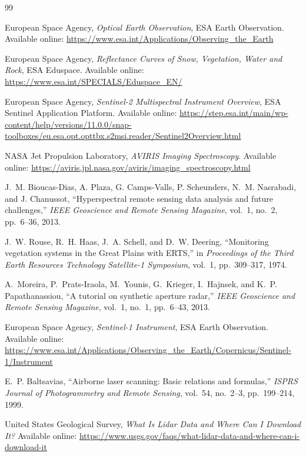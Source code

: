 \documentclass[11pt,a4paper]{article}
\begin{document}
\begin{thebibliography}{99}

European Space Agency,
\textit{Optical Earth Observation},
ESA Earth Observation.
Available online:
\url{https://www.esa.int/Applications/Observing_the_Earth}

European Space Agency,
\textit{Reflectance Curves of Snow, Vegetation, Water and Rock},
ESA Eduspace.
Available online:
\url{https://www.esa.int/SPECIALS/Eduspace_EN/}

European Space Agency,
\textit{Sentinel-2 Multispectral Instrument Overview},
ESA Sentinel Application Platform.
Available online:
\url{https://step.esa.int/main/wp-content/help/versions/11.0.0/snap-toolboxes/eu.esa.opt.opttbx.s2msi.reader/Sentinel2Overview.html}

NASA Jet Propulsion Laboratory,
\textit{AVIRIS Imaging Spectroscopy}.
Available online:
\url{https://aviris.jpl.nasa.gov/aviris/imaging_spectroscopy.html}

J.~M. Bioucas-Dias, A. Plaza, G. Camps-Valls, P. Scheunders,
N.~M. Nasrabadi, and J. Chanussot,
``Hyperspectral remote sensing data analysis and future challenges,''
\textit{IEEE Geoscience and Remote Sensing Magazine},
vol.~1, no.~2, pp.~6--36, 2013.

J.~W. Rouse, R.~H. Haas, J.~A. Schell, and D.~W. Deering,
``Monitoring vegetation systems in the Great Plains with ERTS,''
in \textit{Proceedings of the Third Earth Resources Technology
Satellite-1 Symposium},
vol.~1, pp.~309--317, 1974.

A.~Moreira, P.~Prats-Iraola, M.~Younis, G.~Krieger, I.~Hajnsek,
and K.~P. Papathanassiou,
``A tutorial on synthetic aperture radar,''
\textit{IEEE Geoscience and Remote Sensing Magazine},
vol.~1, no.~1, pp.~6--43, 2013.

European Space Agency,
\textit{Sentinel-1 Instrument},
ESA Earth Observation.
Available online:
\url{https://www.esa.int/Applications/Observing_the_Earth/Copernicus/Sentinel-1/Instrument}

E.~P. Baltsavias,
``Airborne laser scanning: Basic relations and formulas,''
\textit{ISPRS Journal of Photogrammetry and Remote Sensing},
vol.~54, no.~2--3, pp.~199--214, 1999.

United States Geological Survey,
\textit{What Is Lidar Data and Where Can I Download It?}
Available online:
\url{https://www.usgs.gov/faqs/what-lidar-data-and-where-can-i-download-it}


\end{thebibliography}
\end{document}
